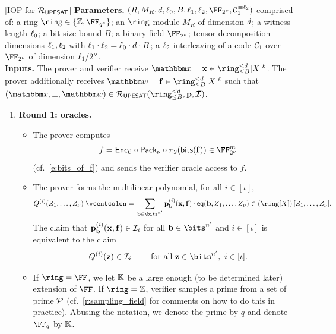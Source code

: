 \documentclass[11pt,letterpaper,usenames,dvipsnames]{article}
\begin{document}
\begin{construction}\label{c:iop_pimsat}
[IOP for {$\mathcal{R}_{\mathsf{UPESAT}}$}]
\noindent \textbf{Parameters.} 
$(R,M_R,\moduledegree,  \codedim_0, B, \codedim_1,\codedim_2, \comfield,\cC_1^{\equiv \codedim_2})$ comprised of: a ring $\ring\in \{\ZZ,\FF_{q^e}\}$; an $\ring$-module $M_R$ of dimension $d$; a witness length $\ell_0$; a bit-size bound $B$; a binary field $\comfield$; tensor decomposition dimensions $\ell_1, \ell_2$ with $\ell_1\cdot \ell_2= \ell_0\cdot d\cdot B$; a $\ell_2$-interleaving of a code $\mathcal{C}_1$ over $\comfield$ of dimension $\ell_1/2^\nu$.\\


\noindent \textbf{Inputs.} The prover and verifier receive $\inp=\xx\in \ringtwobounds{B}{\moduledegree}[X]^{\inplen}$. The prover additionally receives $\wit= \bff\in \ringtwobounds{B}{\moduledegree}[X]^\codedim$ such that $(\inp,\bot, \wit) \in \PIMSAT(\ringtwobounds{B}{\moduledegree}, \pp, \bm{\ideal})$. 



\newcommand{\iopmlechallenge}{S}
\begin{enumerate}[leftmargin=*] 
\item \textbf{Round 1: oracles.}
\begin{itemize}[leftmargin=*]
\item The prover  computes $$f= \Enc_{\cC}\circ \pack\circ\pi_2(\mathsf{bits}(\bff)) \in \comfield^{\codelength}$$ (cf.\ \eqref{e:bits_of_f}) and sends  the verifier oracle access to $f$. 
\item The prover forms the multilinear polynomial, for all $i\in [\iota]$,
%
$$
Q^{(i)}(Z_1, \ldots, Z_\nu) \defeq \sum_{\bb\in\bits^{n'}}\pp_{\bb}^{(i)}(\xx,\bff) \cdot \eq(\bb, Z_1, \ldots, Z_\nu) \in \left(\ring[X]\right)[Z_1, \ldots, Z_\nu].
$$
%
The  claim that  $\mathbf{p}_{\mathbf{b}}^{(i)}(\mathbf{x}, \mathbf{f}) \in \mathcal{I}_i$  for all  $\bb\in \bits^{n'}$ and $i \in [\iota]$ is equivalent to the claim 
%
\begin{equation}\label{e:iop_ideal_eq}
   Q^{(i)}(\zz) \in \ideal_i \qquad  \text{ for all } \zz\in \bits^{n'}, \ i \in [\iota].
\end{equation}
%
\item If $\ring=\FF$, we let $\mathbb{K}$ be a large enough (to be determined later) extension of $\FF$. If $\ring=\ZZ$, verifier samples a prime  from a set of prime $\mathcal{P}$ (cf.\ \cref{r:sampling_field} for comments on how to do this in practice). Abusing the notation, we denote the prime by $q$ and denote $\FF_q$ by $\mathbb{K}$.


\end{itemize}
\end{enumerate}
\end{construction}
\end{document}
